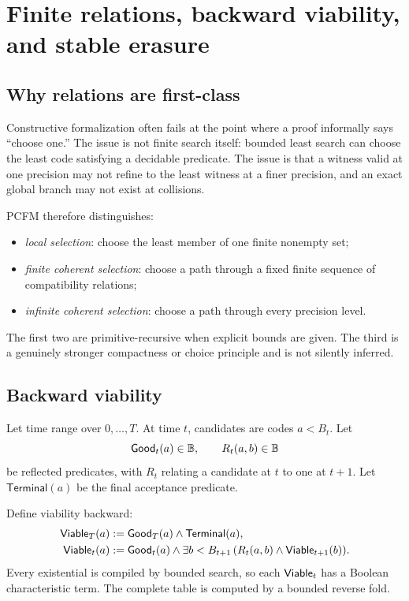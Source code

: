 
\section{Finite relations, backward viability, and stable erasure}
\label{sec:relational}

\subsection{Why relations are first-class}

Constructive formalization often fails at the point where a proof informally
says ``choose one.''  The issue is not finite search itself: bounded least
search can choose the least code satisfying a decidable predicate.  The issue
is that a witness valid at one precision may not refine to the least witness
at a finer precision, and an exact global branch may not exist at collisions.

PCFM therefore distinguishes:

\begin{itemize}
\item \emph{local selection}: choose the least member of one finite nonempty
set;
\item \emph{finite coherent selection}: choose a path through a fixed finite
sequence of compatibility relations;
\item \emph{infinite coherent selection}: choose a path through every
precision level.
\end{itemize}

The first two are primitive-recursive when explicit bounds are given.  The
third is a genuinely stronger compactness or choice principle and is not
silently inferred.

\subsection{Backward viability}

Let time range over \(0,\ldots,T\).  At time \(t\), candidates are codes
\(a<B_t\).  Let
\[
  \mathsf{Good}_t(a)\in\mathbb{B},\qquad
  R_t(a,b)\in\mathbb{B}
\]
be reflected predicates, with \(R_t\) relating a candidate at \(t\) to one at
\(t+1\).  Let \(\mathsf{Terminal}(a)\) be the final acceptance predicate.

Define viability backward:
\[
\begin{aligned}
 \mathsf{Viable}_T(a)
   &\mathrel{:=} \mathsf{Good}_T(a)\wedge\mathsf{Terminal}(a),\\
 \mathsf{Viable}_t(a)
   &\mathrel{:=} \mathsf{Good}_t(a)\wedge
      \exists b<B_{t+1}\,
        (R_t(a,b)\wedge\mathsf{Viable}_{t+1}(b)).
\end{aligned}
\]
Every existential is compiled by bounded search, so each \(\mathsf{Viable}_t\) has a
Boolean characteristic term.  The complete table is computed by a bounded
reverse fold.


